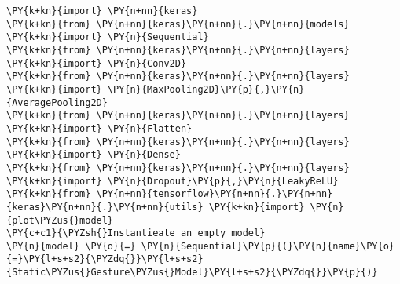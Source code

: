     \begin{tcolorbox}[breakable, size=fbox, boxrule=1pt, pad at break*=1mm,colback=cellbackground, colframe=cellborder]
\begin{Verbatim}[commandchars=\\\{\}]
\PY{k+kn}{import} \PY{n+nn}{keras} 
\PY{k+kn}{from} \PY{n+nn}{keras}\PY{n+nn}{.}\PY{n+nn}{models} \PY{k+kn}{import} \PY{n}{Sequential}
\PY{k+kn}{from} \PY{n+nn}{keras}\PY{n+nn}{.}\PY{n+nn}{layers} \PY{k+kn}{import} \PY{n}{Conv2D}
\PY{k+kn}{from} \PY{n+nn}{keras}\PY{n+nn}{.}\PY{n+nn}{layers} \PY{k+kn}{import} \PY{n}{MaxPooling2D}\PY{p}{,}\PY{n}{AveragePooling2D}
\PY{k+kn}{from} \PY{n+nn}{keras}\PY{n+nn}{.}\PY{n+nn}{layers} \PY{k+kn}{import} \PY{n}{Flatten}
\PY{k+kn}{from} \PY{n+nn}{keras}\PY{n+nn}{.}\PY{n+nn}{layers} \PY{k+kn}{import} \PY{n}{Dense}
\PY{k+kn}{from} \PY{n+nn}{keras}\PY{n+nn}{.}\PY{n+nn}{layers} \PY{k+kn}{import} \PY{n}{Dropout}\PY{p}{,}\PY{n}{LeakyReLU}
\PY{k+kn}{from} \PY{n+nn}{tensorflow}\PY{n+nn}{.}\PY{n+nn}{keras}\PY{n+nn}{.}\PY{n+nn}{utils} \PY{k+kn}{import} \PY{n}{plot\PYZus{}model}
\PY{c+c1}{\PYZsh{}Instantieate an empty model}
\PY{n}{model} \PY{o}{=} \PY{n}{Sequential}\PY{p}{(}\PY{n}{name}\PY{o}{=}\PY{l+s+s2}{\PYZdq{}}\PY{l+s+s2}{Static\PYZus{}Gesture\PYZus{}Model}\PY{l+s+s2}{\PYZdq{}}\PY{p}{)}


\end{Verbatim}
\end{tcolorbox}
